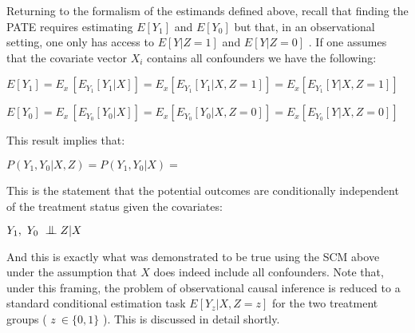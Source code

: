 \documentclass[../main.tex]{subfiles}
\begin{document}
\vspace{\baselineskip}
Returning to the formalism of the estimands defined above, recall that finding the PATE requires estimating  \( E \left[ Y_{1} \right]  \) and  \( E \left[ Y_{0} \right]  \)  but that, in an observational setting, one only has access to  \( E \left[ Y \vert  Z = 1 \right]  \)  and  \( E \left[ Y \vert  Z=0  \right]  \) . If one assumes that the covariate vector  \( X_{i} \) contains all confounders we have the following:\par


\vspace{\baselineskip}
\begin{adjustwidth}{0.5in}{0.0in}
 \( E \left[ Y_{1} \right]  = E_{x~} \left[  E_{Y_{1}} \left[ Y_{1}  \vert  X \right]   \right]  = E_{x} \left[ E_{Y_{1}} \left[ Y_{1}  \vert  X, Z=1 \right]  \right]  =E_{x} \left[ E_{Y_{1}} \left[ Y_{}  \vert  X, Z=1 \right]  \right]  \) \par

\end{adjustwidth}

\begin{adjustwidth}{0.5in}{0.0in}
 \( E \left[ Y_{0} \right]  = E_{x~} \left[  E_{Y_{0}} \left[ Y_{0}  \vert  X \right]   \right]  = E_{x} \left[ E_{Y_{0}} \left[ Y_{0}  \vert  X, Z=0 \right]  \right]  =E_{x} \left[ E_{Y_{0}} \left[ Y_{}  \vert  X, Z=0 \right]  \right]  \) \par

\end{adjustwidth}


\vspace{\baselineskip}
This result implies that:\par


\vspace{\baselineskip}
 \( P \left( Y_{1}, Y_{0}  \vert  X, Z  \right) =P \left( Y_{1}, Y_{0} \vert  X \right)  =   \) \par


\vspace{\baselineskip}
This is the statement that the potential outcomes are conditionally independent of the treatment status given the covariates:\par

 \( Y_{1},~Y_{0} ~ \bigCI Z  \vert  X \) \par

And this is exactly what was demonstrated to be true using the SCM above under the assumption that  \( X \) does indeed include all confounders. Note that, under this framing, the problem of observational causal inference is reduced to a standard conditional estimation task  \( E \left[ Y_{z}  \vert  X, Z=z \right]  \) for the two treatment groups ( \( z~ \in  \{ 0, 1 \}  \) ). This is discussed in detail shortly.\par
\end{document}
